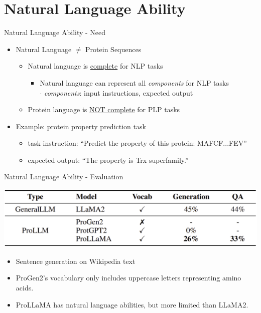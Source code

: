 \section{Natural Language Ability}
\begin{frame}{Natural Language Ability - Need}
	\begin{itemize}\setlength\itemsep{3em}
		\item Natural Language $\neq$ Protein Sequences
		\begin{itemize}\setlength\itemsep{1em}
			\item Natural language is \underline{complete} for NLP tasks
			\begin{itemize}
				\item Natural language can represent all \emph{components} for NLP tasks
				\\$\cdot$ \emph{components}: input instructions, expected output
			\end{itemize}
			\item Protein language is \underline{NOT complete} for PLP tasks
		\end{itemize}
		\item Example: protein property prediction task
		\begin{itemize}
			\item task instruction: ``Predict the property of this protein: MAFCF...FEV''
			\item expected output: ``The property is Trx superfamily.''
		\end{itemize}
	\end{itemize}
\end{frame}

\begin{frame}{Natural Language Ability - Evaluation}
	\begin{center}
		\includegraphics[scale=0.21]{tables/natural_language_ability_comparison.png}
	\end{center}
	\begin{itemize}
		\item Sentence generation on Wikipedia text
		\item ProGen2's vocabulary only includes uppercase letters representing amino acids.
		\item ProLLaMA has natural language abilities, but more limited than LLaMA2.
	\end{itemize}
\end{frame}